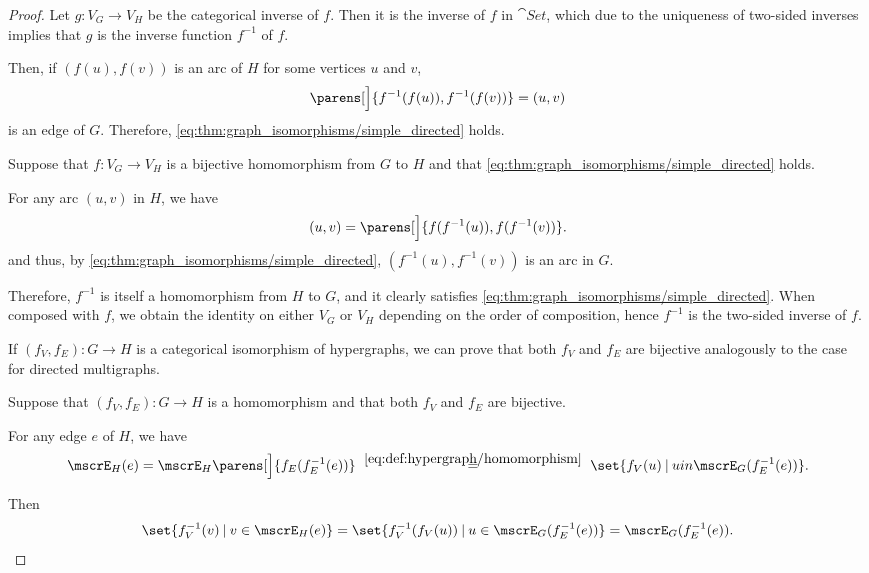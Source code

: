 \begin{proof}
  Let \( g: V_G \to V_H \) be the categorical inverse of \( f \). Then it is the inverse of \( f \) in \( \cat{Set} \), which due to the uniqueness of two-sided inverses implies that \( g \) is the inverse function \( f^{-1} \) of \( f \).

  Then, if \( (f(u), f(v)) \) is an arc of \( H \) for some vertices \( u \) and \( v \),
  \begin{equation*}
    \parens[\Big]{ f^{-1}(f(u)), f^{-1}(f(v)) } = (u, v)
  \end{equation*}
  is an edge of \( G \). Therefore, \eqref{eq:thm:graph_isomorphisms/simple_directed} holds.

  \NecessitySubProof* Suppose that \( f: V_G \to V_H \) is a bijective homomorphism from \( G \) to \( H \) and that \eqref{eq:thm:graph_isomorphisms/simple_directed} holds.

  For any arc \( (u, v) \) in \( H \), we have
  \begin{equation*}
    (u, v) = \parens[\Big]{ f(f^{-1}(u)), f(f^{-1}(v)) }.
  \end{equation*}
  and thus, by \eqref{eq:thm:graph_isomorphisms/simple_directed}, \( (f^{-1}(u), f^{-1}(v)) \) is an arc in \( G \).

  Therefore, \( f^{-1} \) is itself a homomorphism from \( H \) to \( G \), and it clearly satisfies \eqref{eq:thm:graph_isomorphisms/simple_directed}. When composed with \( f \), we obtain the identity on either \( V_G \) or \( V_H \) depending on the order of composition, hence \( f^{-1} \) is the two-sided inverse of \( f \).


  \SufficiencySubProof* If \( (f_V, f_E): G \to H \) is a categorical isomorphism of hypergraphs, we can prove that both \( f_V \) and \( f_E \) are bijective analogously to the case for directed multigraphs.

  \NecessitySubProof* Suppose that \( (f_V, f_E): G \to H \) is a homomorphism and that both \( f_V \) and \( f_E \) are bijective.

  For any edge \( e \) of \( H \), we have
  \begin{equation*}
    \mscrE_H(e)
    =
    \mscrE_H\parens[\Big]{ f_E(f_E^{-1}(e)) }
    \reloset {\eqref{eq:def:hypergraph/homomorphism}} =
    \set{ f_V(u) \given u in \mscrE_G(f_E^{-1}(e)) }.
  \end{equation*}

  Then
  \begin{equation*}
    \set{ f_V^{-1}(v) \given v \in \mscrE_H(e) }
    =
    \set{ f_V^{-1}(f_V(u)) \given u \in \mscrE_G(f_E^{-1}(e)) }
    =
    \mscrE_G(f_E^{-1}(e)).
  \end{equation*}


\end{proof}
